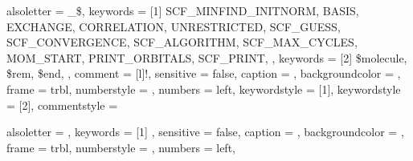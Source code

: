 

{
	alsoletter = {_\$},
	keywords = [1]{
		SCF_MINFIND_INITNORM,
		BASIS,
		EXCHANGE,
		CORRELATION,
		UNRESTRICTED,
		SCF_GUESS,
		SCF_CONVERGENCE,
		SCF_ALGORITHM,
		SCF_MAX_CYCLES,
		MOM_START,
		PRINT_ORBITALS,
		SCF_PRINT,
	},
	keywords = [2]{
		\$molecule,
		\$rem,
		\$end,
	},
	comment = [l]{!},
	sensitive = false, %
	caption = \lstname,
	backgroundcolor = \color{Cornsilk},
	frame = trbl,
	numberstyle = \tiny\ttfamily\noncopy, %
	numbers = left,
	keywordstyle = [1]{\color{eclipsePurple}},
	keywordstyle = [2]{\color{Navy}},
	commentstyle = \color{eclipseGreen}
}

\captionsetup[lstlisting]{textfont = tt}

\newcommand*{\qchemsection}[1]{{\color{Navy} \texttt{\$#1}}}
\newcommand*{\qchemremvar}[1]{{\color{eclipsePurple} \texttt{#1}}}


{
	alsoletter = {},
	keywords = [1]{
	},
	sensitive = false, %
	caption = \lstname,
	backgroundcolor = \color{Cornsilk},
	frame = trbl,
	numberstyle = \tiny\ttfamily\noncopy, %
	numbers = left,
}